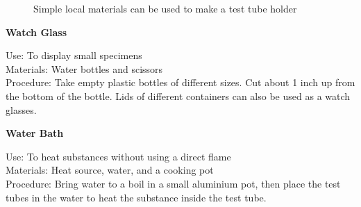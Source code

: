 \begin{figure}[h]
\begin{center}
\def\svgwidth{4cm}

\caption{Simple local materials can be used to make a test tube holder}
\label{fig:tube-holder}
\end{center}
\end{figure}


\begin{flushleft}
\textbf{Watch Glass}
\end{flushleft}
\vspace{-10pt}
Use: To display small specimens\\
Materials: Water bottles and scissors\\
Procedure: Take empty plastic bottles of different sizes. Cut about 1 inch up from the bottom of the bottle. Lids of different containers can also be used as a watch glasses.\\

\begin{flushleft}
\textbf{Water Bath}
\end{flushleft}
\vspace{-10pt}
Use: To heat substances without using a direct flame\\
Materials: Heat source, water, and a cooking pot\\
Procedure: Bring water to a boil in a small aluminium pot, then place the test tubes in the water to heat the substance inside the test tube.\\

